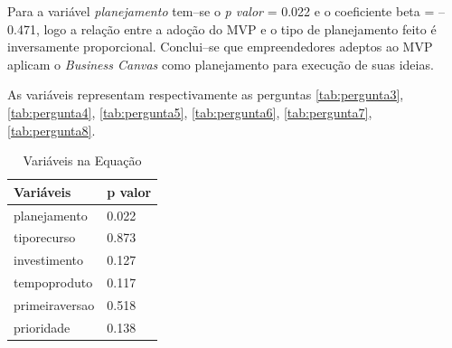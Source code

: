 Para a vari\'avel \emph{planejamento} tem--se o \emph{p valor} = 0.022 e o coeficiente beta = --0.471, logo a rela\c{c}\~ao entre a ado\c{c}\~ao do MVP e o tipo de planejamento feito \'e inversamente proporcional. Conclui--se que empreendedores adeptos ao MVP aplicam o \emph{Business Canvas} como planejamento para execu\c{c}\~ao de suas ideias.

As vari\'aveis representam respectivamente as perguntas \ref{tab:pergunta3}, \ref{tab:pergunta4}, \ref{tab:pergunta5}, \ref{tab:pergunta6}, \ref{tab:pergunta7}, \ref{tab:pergunta8}.

\begin{table}[hb]
\centering
\caption{Vari\'aveis na Equa\c{c}\~ao}
\label{tab:inferencial2}
\begin{tabular}{|p{5cm}|p{3cm}|}
\hline{\bf Vari\'aveis} & {\bf p valor}\\
\hline planejamento & 0.022\\
\hline tiporecurso & 0.873\\
\hline investimento & 0.127\\
\hline tempoproduto & 0.117\\
\hline primeiraversao & 0.518\\
\hline prioridade & 0.138\\
\hline
\end{tabular}
\end{table}